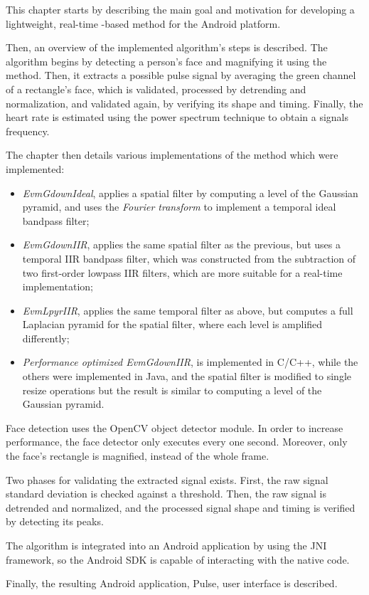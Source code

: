 This chapter starts by describing the main goal and motivation for developing a
lightweight, real-time \evm{}-based method for the Android platform.

Then, an overview of the implemented algorithm's
steps is described.
The algorithm begins by detecting a person's face and magnifying it
using the \evm{} method. Then, it extracts a possible pulse signal by averaging
the green channel of a rectangle's face, which is validated, processed by
detrending and normalization, and validated again, by verifying its shape
and timing. Finally, the heart rate is estimated using the power spectrum
technique to obtain a signals frequency.

The chapter then details various implementations of the \evm{} method
which were implemented:
\begin{itemize}
  \item \emph{EvmGdownIdeal}, applies a spatial filter by computing a level
        of the Gaussian pyramid, and uses the \emph{Fourier transform} to
        implement a temporal ideal bandpass filter;
  \item \emph{EvmGdownIIR}, applies the same spatial filter as the previous,
        but uses a temporal IIR bandpass filter, which was constructed from
        the subtraction of two first-order lowpass IIR filters, which are more
        suitable for a real-time implementation;
  \item \emph{EvmLpyrIIR}, applies the same temporal filter as above, but
        computes a full Laplacian pyramid for the spatial filter, where each
        level is amplified differently;
  \item \emph{Performance optimized EvmGdownIIR}, is implemented in C/C++,
        while the others were implemented in Java, and the spatial filter
        is modified to single resize operations but the result is similar
        to computing a level of the Gaussian pyramid.
\end{itemize}

Face detection uses the OpenCV object detector module. In order to increase
performance, the face detector only executes every one second. Moreover,
only the face's rectangle is magnified, instead of the whole frame.

Two phases for validating the extracted signal exists. First, the raw
signal standard deviation is checked against a threshold. Then, the raw signal
is detrended and normalized, and the processed signal shape and timing is
verified by detecting its peaks.

The algorithm is integrated into an Android application by using
the JNI framework, so the Android SDK is capable of interacting with
the native code.

Finally, the resulting Android application, Pulse, user interface is described.
